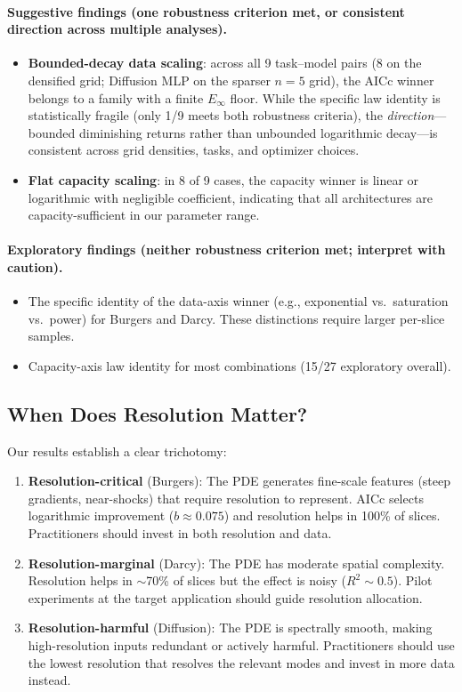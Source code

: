 \documentclass[11pt]{article}
\newcommand{\Einf}{E_\infty}
\begin{document}
\paragraph{Suggestive findings (one robustness criterion met, or
consistent direction across multiple analyses).}
\begin{itemize}
  \item \textbf{Bounded-decay data scaling}: across all 9 task--model
    pairs (8 on the densified grid; Diffusion MLP on the sparser
    $n=5$ grid), the AICc winner belongs to a family
    with a finite $\Einf$ floor. While the specific law identity is
    statistically fragile (only 1/9 meets both robustness criteria),
    the \emph{direction}---bounded diminishing returns rather than
    unbounded logarithmic decay---is consistent across grid densities,
    tasks, and optimizer choices.
  \item \textbf{Flat capacity scaling}: in 8 of 9 cases, the
    capacity winner is linear or logarithmic with negligible
    coefficient, indicating that all architectures are
    capacity-sufficient in our parameter range.
\end{itemize}

\paragraph{Exploratory findings (neither robustness criterion met;
interpret with caution).}
\begin{itemize}
  \item The specific identity of the data-axis winner
    (e.g., exponential vs.\ saturation vs.\ power) for Burgers and
    Darcy. These distinctions require larger per-slice samples.
  \item Capacity-axis law identity for most combinations
    (15/27 exploratory overall).
\end{itemize}

\subsection{When Does Resolution Matter?}

Our results establish a clear trichotomy:
\begin{enumerate}
  \item \textbf{Resolution-critical} (Burgers): The PDE generates
    fine-scale features (steep gradients, near-shocks) that require
    resolution to represent. AICc selects logarithmic improvement
    ($b \approx 0.075$) and resolution helps in 100\% of slices.
    Practitioners should invest in both resolution and data.
  \item \textbf{Resolution-marginal} (Darcy): The PDE has moderate
    spatial complexity. Resolution helps in $\sim$70\% of slices but
    the effect is noisy ($R^2 \sim 0.5$). Pilot experiments at the
    target application should guide resolution allocation.
  \item \textbf{Resolution-harmful} (Diffusion): The PDE is
    spectrally smooth, making high-resolution inputs redundant or
    actively harmful. Practitioners should use the lowest resolution
    that resolves the relevant modes and invest in more data instead.
\end{enumerate}
\end{document}
